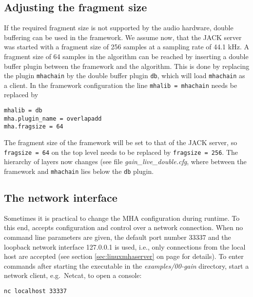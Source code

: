 \subsection{Adjusting the fragment size}%
%
%

If the required fragment size is not supported by the audio hardware,
double buffering can be used in the \mha{} framework. We assume now,
that the JACK server was started with a fragment size of 256 samples at
a sampling rate of 44.1 kHz. A fragment size of 64 samples in the algorithm 
can be reached by inserting a double buffer plugin between the framework and the algorithm. This is
done by replacing the \mha{} plugin \verb!mhachain! by the double
buffer plugin \verb!db!, which will load \verb!mhachain! as a
client. In the framework configuration the line \verb!mhalib = mhachain! needs
be replaced by
\begin{verbatim}
mhalib = db
mha.plugin_name = overlapadd
mha.fragsize = 64
\end{verbatim}
The fragment size of the framework will be set to that of the JACK
server, so \verb!fragsize = 64! on the top level needs to be replaced by
\verb!fragsize = 256!. The hierarchy of layers now changes (see 
file \emph{gain\_live\_double.cfg}, where between the framework
and \verb!mhachain! lies below the \verb!db! plugin.


\subsection{The \mha{} network interface}%
\label{sec:example_network}%
%
%
Sometimes it is practical to change the MHA configuration during runtime. To
this end, \mha{} accepts configuration and control over a network connection.
%
When no command line parameters are given, the default port number
33337 and the loopback network interface 127.0.0.1 is used, i.e., only
connections from the local host are accepted (see section
\ref{sec:linuxmhaserver} on page \pageref{sec:linuxmhaserver} for
details).
%
To enter \mha{} commands after starting the \mha{} executable in the
\emph{examples/00-gain} directory, 
start a network client, e.g.\ Netcat, to
open a \mha{} console:
\begin{verbatim}nc localhost 33337\end{verbatim}

